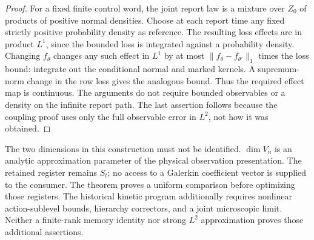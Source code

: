 \begin{proof}
For a fixed finite control word, the joint report law is a mixture over
$Z_0$ of products of positive normal densities. Choose at each report time
any fixed strictly positive probability density as reference. The
resulting loss effects are in product $L^1$, since the bounded loss is
integrated against a probability density. Changing $f_\theta$ changes
any such effect in $L^1$ by at most $\|f_\theta-f_{\theta'}\|_1$ times
the loss bound: integrate out the conditional normal and marked kernels.
A supremum-norm change in the row loss gives the analogous bound.
Thus the required effect map is continuous. The arguments do not require
bounded observables or a density on the infinite report path. The last
assertion follows because the coupling proof uses only the full
observable error in $L^2$, not how it was obtained.
\end{proof}

The two dimensions in this construction must not be identified.
$\dim V_n$ is an analytic approximation parameter of the physical
observation presentation. The retained register remains $S_t$; no access
to a Galerkin coefficient vector is supplied to the consumer. The theorem
proves a uniform comparison before optimizing those registers. The
historical kinetic program additionally requires nonlinear action-sublevel
bounds, hierarchy correctors, and a joint microscopic limit. Neither a
finite-rank memory identity nor strong $L^2$ approximation proves those
additional assertions.
